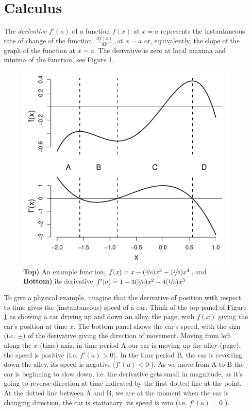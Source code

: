 \section{Calculus}

The \emph{derivative} $f'(a)$ of a function $f(x)$ at $x=a$ represents
the instantaneous rate of change of the function, $\frac{df(x)}{dx}$, at $x=a$ or,
equivalently, the slope of the graph of the function at $x=a$. The
derivative is zero at local maxima and minima of the function, see Figure \ref{Fig:derivative}.
    
\begin{figure}
 \begin{center}
   \includegraphics[width=0.7 \textwidth]{math_background/calc_pics/Derivat.pdf}\end{center}
 \caption{{\bf Top)} An example function, $f(x) = x -(\nicefrac{5}{6})x^3  -
   (\nicefrac{1}{3}) x^4$, and {\bf Bottom)} its derivative $f'(a) = 1 - 3(\nicefrac{5}{6}) x^2 -4 (\nicefrac{1}{3}) x^3$
   }\label{Fig:derivative}
\end{figure}
To give a physical example, imagine that the derivative of position with respect to
time gives the (instantaneous) speed of a car. Think of the top panel of Figure \ref{Fig:derivative}
as showing a car driving up and down an
alley, the page, with $f(x)$ giving the car's position at time $x$. The bottom panel
shows the car's speed, with the sign (i.e. $\pm$) of the derivative giving the direction of
movement. Moving from left along the $x$ (time) axis, in time period A our car is moving up the alley (page), the speed is
positive (i.e. $f'(a)>0$). In the time period B, the car is reversing down the alley, its speed is negative ($f'(a)<0$ ).  
As we move from A to B the car is beginning to slow down, i.e. the derivative gets small
in magnitude, as it's going to reverse direction at time indicated by
the first dotted line at the point. At the
dotted line between A and B, we are at the moment when the car is changing direction, the car is
stationary, its speed is zero (i.e. $f'(a)=0$ ). 

